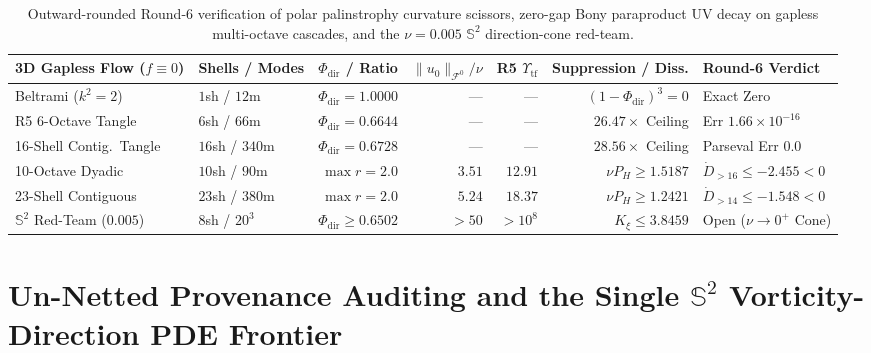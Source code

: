 \documentclass[11pt]{article}
\theoremstyle{plain}
\theoremstyle{definition}
\begin{document}
\begin{table}[htbp]
\centering
\caption{Outward-rounded Round-6 verification of polar palinstrophy curvature scissors, zero-gap Bony paraproduct UV decay on gapless multi-octave cascades, and the $\nu = 0.005$ $\mathbb{S}^2$ direction-cone red-team.}
\label{tab:step7}
\vspace{4pt}
{\footnotesize\setlength{\tabcolsep}{2.4pt}
\begin{tabular}{@{}llrrrrl@{}}
\toprule
3D Gapless Flow ($f \equiv 0$) & Shells / Modes & $\Phi_{\mathrm{dir}}$ / Ratio & $\|u_0\|_{\mathcal{F}^0}/\nu$ & R5 $\Upsilon_{\mathrm{tf}}$ & Suppression / Diss. & Round-6 Verdict \\
\midrule
Beltrami ($k^2 = 2$)     & $1$sh / $12$m   & $\Phi_{\mathrm{dir}} = 1.0000$ & ---    & ---     & $(1-\Phi_{\mathrm{dir}})^3 = 0$ & Exact Zero \\
R5 6-Octave Tangle       & $6$sh / $66$m   & $\Phi_{\mathrm{dir}} = 0.6644$ & ---    & ---     & $26.47\times$ Ceiling           & Err $1.66\times 10^{-16}$ \\
16-Shell Contig.\ Tangle & $16$sh / $340$m & $\Phi_{\mathrm{dir}} = 0.6728$ & ---    & ---     & $28.56\times$ Ceiling           & Parseval Err $0.0$ \\
10-Octave Dyadic         & $10$sh / $90$m  & $\max r = 2.0$                 & $3.51$ & $12.91$ & $\nu P_H \ge 1.5187$            & $\dot{D}_{>16} \le -2.455 < 0$ \\
23-Shell Contiguous      & $23$sh / $380$m & $\max r = 2.0$                 & $5.24$ & $18.37$ & $\nu P_H \ge 1.2421$            & $\dot{D}_{>14} \le -1.548 < 0$ \\
$\mathbb{S}^2$ Red-Team ($0.005$) & $8$sh / $20^3$ & $\Phi_{\mathrm{dir}} \ge 0.6502$ & $> 50$ & $> 10^8$ & $K_\xi \le 3.8459$       & Open ($\nu \to 0^+$ Cone) \\
\bottomrule
\end{tabular}}
\end{table}

\section{Un-Netted Provenance Auditing and the Single $\mathbb{S}^2$ Vorticity-Direction PDE Frontier}\label{sec:frontier}
\end{document}
